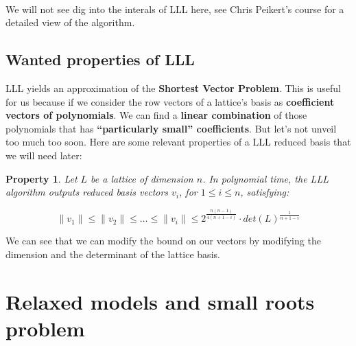 \documentclass[a4paper,11pt]{article}
\newtheorem{property}{Property}
\begin{document}
\\

We will not see dig into the interals of LLL here, see Chris Peikert's course\cite{chrispeikert} for a detailed view of the algorithm.

\subsection{Wanted properties of LLL}

LLL yields an approximation of the \textbf{Shortest Vector Problem}. This is useful for us because if we consider the row vectors of a lattice's basis as \textbf{coefficient vectors of polynomials}. We can find a \textbf{linear combination} of those polynomials that has \textbf{``particularly small'' coefficients}. But let's not unveil too much too soon. Here are some relevant properties of a LLL reduced basis that we will need later:

\begin{property}
Let $L$ be a lattice of dimension $n$. In polynomial time, the LLL algorithm outputs reduced basis vectors $v_i$, for $1 \leq i \leq n$, satisfying:

\[ \|v_1\| \leq \|v_2\| \leq \hdots \leq \|v_i\| \leq 2^{\frac{n(n-1)}{4(n+1-i)}} \cdot det(L)^{\frac{1}{n+1-i}} \]
\end{property}

We can see that we can modify the bound on our vectors by modifying the dimension and the determinant of the lattice basis.

\section{Relaxed models and small roots problem}\label{attacks}
\end{document}
